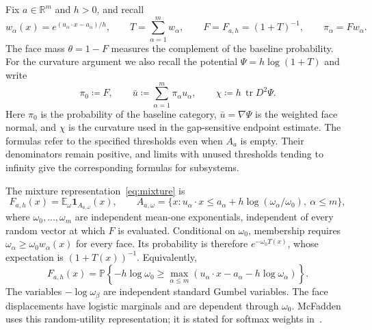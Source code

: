 \documentclass[11pt,letterpaper]{article}
\theoremstyle{remark}
\newcommand{\E}{\mathbb E}
\newcommand{\Pp}{\mathbb P}
\newcommand{\R}{\mathbb R}
\newcommand{\tr}{\operatorname{tr}}
\newcommand{\ind}{\mathbf 1}
\begin{document}
Fix \(a\in\R^m\) and \(h>0\), and recall
\[
 w_\alpha(x)=e^{(u_\alpha\cdot x-a_\alpha)/h},\qquad
 T=\sum_{\alpha=1}^m w_\alpha,\qquad
 F=F_{a,h}=(1+T)^{-1},\qquad \pi_\alpha=Fw_\alpha.
\]
The face mass \(\theta=1-F\) measures the complement of the baseline
probability. For the curvature argument we also recall the potential
\(\Psi=h\log(1+T)\) and write
\[
 \pi_0\coloneqq F,\qquad
 \bar u\coloneqq\sum_{\alpha=1}^m\pi_\alpha u_\alpha,
 \qquad \chi\coloneqq h\,\tr D^2\Psi.
\]
Here \(\pi_0\) is the probability of the baseline category,
\(\bar u=\nabla\Psi\) is the weighted face normal, and
\(\chi\) is the curvature used in the gap-sensitive endpoint
estimate. The formulas refer to the specified thresholds even when
\(A_a\) is empty. Their denominators remain positive, and limits
with unused thresholds tending to infinity give the corresponding
formulas for subsystems.

The mixture representation~\eqref{eq:mixture} is
\[
 F_{a,h}(x)=\E_\omega\ind_{A_{a,\omega}}(x),\qquad
 A_{a,\omega}=\{x:u_\alpha\cdot x\le
 a_\alpha+h\log(\omega_\alpha/\omega_0),\ \alpha\le m\},
\]
where \(\omega_0,\ldots,\omega_m\) are independent mean-one
exponentials, independent of every random vector at which \(F\) is
evaluated. Conditional on \(\omega_0\), membership requires
\(\omega_\alpha\ge\omega_0w_\alpha(x)\) for every face.
Its probability is therefore \(e^{-\omega_0T(x)}\), whose
expectation is \((1+T(x))^{-1}\). Equivalently,
\[
 F_{a,h}(x)=\Pp\!\left\{-h\log\omega_0\ge
 \max_{\alpha\le m}
 (u_\alpha\cdot x-a_\alpha-h\log\omega_\alpha)\right\}.
\]
The variables \(-\log\omega_\beta\) are independent standard
Gumbel variables. The face displacements have logistic marginals and
are dependent through \(\omega_0\). McFadden~\cite[p.~1001]{McFadden1989}
uses this random-utility representation; it is stated for softmax
weights in~\cite[Lemma~14]{GaoZhang}.
\end{document}

